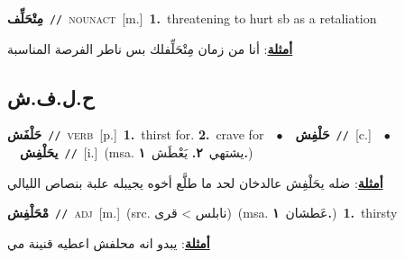 \documentclass[10pt,a4paper,twoside]{article} %
\begin{document}
\begin{multicols}{2}
{\setlength\topsep{0pt}\textbf{\foreignlanguage{arabic}{مِتْحَلِّف}}\ {\color{gray}\texttt{//}\color{black}}\ \textsc{noun\textunderscore act}\ [m.]\ \textbf{1.}~threatening to hurt sb as a retaliation\  \begin{flushright}\color{gray}\foreignlanguage{arabic}{\textbf{\underline{\foreignlanguage{arabic}{أمثلة}}}: أنا من زمان مِتْحَلِّفلك بس ناطر الفرصة المناسبة}\end{flushright}\color{black}} \vspace{2mm}

\vspace{-3mm}
\subsection*{\color{blue}\foreignlanguage{arabic}{ح.ل.ف.ش}\color{blue}{}} 

{\setlength\topsep{0pt}\textbf{\foreignlanguage{arabic}{حَلْفَش}}\ {\color{gray}\texttt{//}\color{black}}\ \textsc{verb}\ [p.]\ \textbf{1.}~thirst for.  \textbf{2.}~crave for\ \ $\bullet$\ \ \setlength\topsep{0pt}\textbf{\foreignlanguage{arabic}{حَلْفِش}}\ {\color{gray}\texttt{//}\color{black}}\ [c.]\ \ $\bullet$\ \ \setlength\topsep{0pt}\textbf{\foreignlanguage{arabic}{يحَلْفِش}}\ {\color{gray}\texttt{//}\color{black}}\ [i.]\ \color{gray}(msa. \foreignlanguage{arabic}{يشتهي}~\foreignlanguage{arabic}{\textbf{٢.}}  \foreignlanguage{arabic}{يَعْطَش}~\foreignlanguage{arabic}{\textbf{١.}})\color{black}\  \begin{flushright}\color{gray}\foreignlanguage{arabic}{\textbf{\underline{\foreignlanguage{arabic}{أمثلة}}}: ضله يحَلْفِش عالدخان لحد ما طلَّع أخوه يجيبله علبة بنصاص الليالي}\end{flushright}\color{black}} \vspace{2mm}

{\setlength\topsep{0pt}\textbf{\foreignlanguage{arabic}{مْحَلْفِش}}\ {\color{gray}\texttt{//}\color{black}}\ \textsc{adj}\ [m.]\ (src. \color{gray}\foreignlanguage{arabic}{نابلس > قرى}\color{black})\ \color{gray}(msa. \foreignlanguage{arabic}{عَطشان}~\foreignlanguage{arabic}{\textbf{١.}})\color{black}\ \textbf{1.}~thirsty\  \begin{flushright}\color{gray}\foreignlanguage{arabic}{\textbf{\underline{\foreignlanguage{arabic}{أمثلة}}}: يبدو انه محلفش اعطيه قنينة مي}\end{flushright}\color{black}} \vspace{2mm}


\end{multicols}
\end{document}

